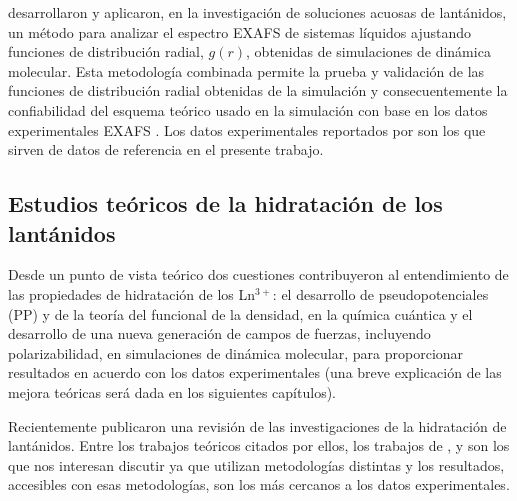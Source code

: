 \cite{Dang2011} desarrollaron y aplicaron, en la investigaci\'on de
soluciones acuosas de lant\'anidos, un m\'etodo para analizar 
el espectro EXAFS de sistemas l\'iquidos ajustando funciones de 
distribuci\'on radial, $g(r)$, obtenidas de simulaciones de 
din\'amica molecular. Esta metodolog\'ia combinada permite la prueba 
y validaci\'on de las funciones de distribuci\'on radial obtenidas de
la simulaci\'on y consecuentemente la confiabilidad del esquema 
te\'orico usado en la simulaci\'on con base en los datos 
experimentales EXAFS \citep{Dang2012}. Los datos experimentales 
reportados por \cite{Dang2011} son los que sirven de datos de 
referencia en el presente trabajo.

\subsection{Estudios te\'oricos de la hidrataci\'on de los 
lant\'anidos}
Desde un punto de vista te\'orico dos cuestiones contribuyeron
al entendimiento de las propiedades de hidrataci\'on de los 
Ln$^{3+}$: el desarrollo de pseudopotenciales (PP) y de la teor\'ia 
del funcional de la densidad, en la qu\'imica cu\'antica y el 
desarrollo de una nueva generaci\'on de campos de fuerzas, 
incluyendo polarizabilidad, en simulaciones de din\'amica molecular,
para proporcionar resultados en acuerdo con los datos experimentales
\citep{Dang2012} (una breve explicaci\'on de las mejora te\'oricas 
ser\'a dada en los siguientes cap\'itulos).

Recientemente \cite{Dang2012} publicaron una revisi\'on de las 
investigaciones de la hidrataci\'on de lant\'anidos. Entre los 
trabajos te\'oricos citados por ellos, los trabajos de 
\cite{Vill2009}, \cite{Ciup2010} y \cite{Kuta2010} son los que nos 
interesan discutir ya que utilizan metodolog\'ias distintas y los
resultados, accesibles con esas metodolog\'ias, son los m\'as 
cercanos a los datos experimentales. 

